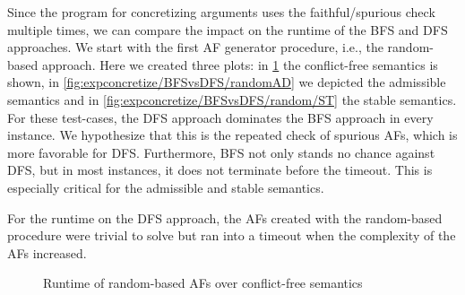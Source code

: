 Since the program for concretizing arguments uses the faithful/spurious check multiple times, we can compare the impact on the runtime of the BFS and DFS approaches. We start with the first AF generator procedure, i.e., the random-based approach. Here we created three plots: in \cref{fig:expconcretize/BFSvsDFS/random/CF} the conflict-free semantics is shown, in \cref{fig:expconcretize/BFSvsDFS/randomAD} we depicted the admissible semantics and in \cref{fig:expconcretize/BFSvsDFS/random/ST} the stable semantics. For these test-cases, the DFS approach dominates the BFS approach in every instance. We hypothesize that this is the repeated check of spurious AFs, which is more favorable for DFS. Furthermore, BFS not only stands no chance against DFS, but in most instances, it does not terminate before the timeout. This is especially critical for the admissible and stable semantics.

For the runtime on the DFS approach, the AFs created with the random-based procedure were trivial to solve but ran into a timeout when the complexity of the AFs increased.


\begin{figure}[H]
    \centering
    \caption{Runtime of random-based AFs over conflict-free semantics}
    \label{fig:expconcretize/BFSvsDFS/random/CF}
\end{figure}


